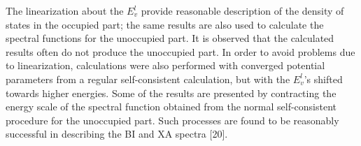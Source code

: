 The linearization about the $E^{l}_{v}$ provide reasonable description of the density of states in the occupied part; the same results are also used to calculate the spectral functions for the unoccupied part. It is observed that the calculated results often do not produce the unoccupied part. In order to avoid problems due to linearization, calculations were also performed with converged potential parameters from a regular self-consistent calculation, but with the $E^{l}_{v}$'s shifted towards higher energies. Some of the results are presented by contracting the energy scale of the spectral function obtained from the normal self-consistent procedure for the unoccupied part. Such processes are found to be reasonably successful in describing the BI and XA spectra [20].
